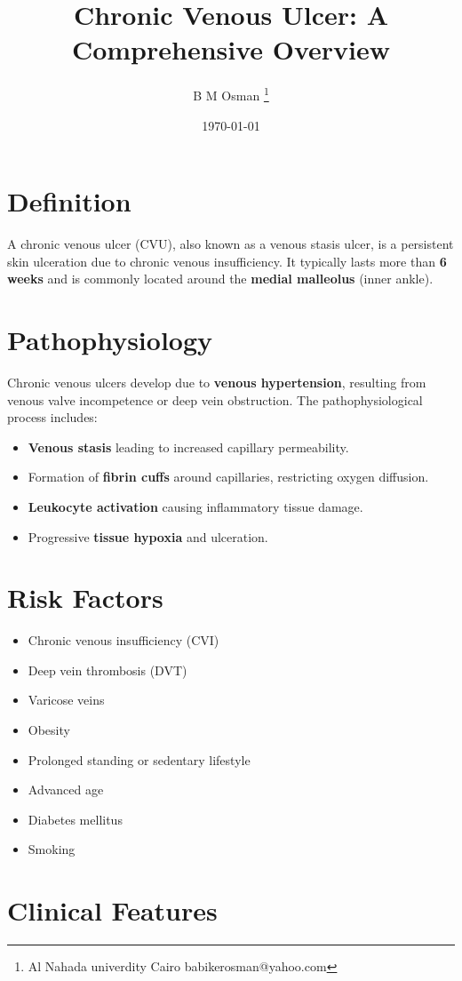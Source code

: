 \documentclass{article}
\title{Chronic Venous Ulcer: A Comprehensive Overview}
\author{B M Osman  \footnote {Al Nahada univerdity Cairo \email babikerosman@yahoo.com }}
\date{\today}
\begin{document}
\maketitle
\tableofcontents  

\section{Definition}
A chronic venous ulcer (CVU), also known as a venous stasis ulcer, is a persistent skin ulceration due to chronic venous insufficiency. It typically lasts more than \textbf{6 weeks} and is commonly located around the \textbf{medial malleolus} (inner ankle).

\section{Pathophysiology}
Chronic venous ulcers develop due to \textbf{venous hypertension}, resulting from venous valve incompetence or deep vein obstruction. The pathophysiological process includes:
\begin{itemize}
    \item \textbf{Venous stasis} leading to increased capillary permeability.
    \item Formation of \textbf{fibrin cuffs} around capillaries, restricting oxygen diffusion.
    \item \textbf{Leukocyte activation} causing inflammatory tissue damage.
    \item Progressive \textbf{tissue hypoxia} and ulceration.
\end{itemize}

\section{Risk Factors}
\begin{itemize}
    \item Chronic venous insufficiency (CVI)
    \item Deep vein thrombosis (DVT)
    \item Varicose veins
    \item Obesity
    \item Prolonged standing or sedentary lifestyle
    \item Advanced age
    \item Diabetes mellitus
    \item Smoking
\end{itemize}

\section{Clinical Features}
\end{document}

